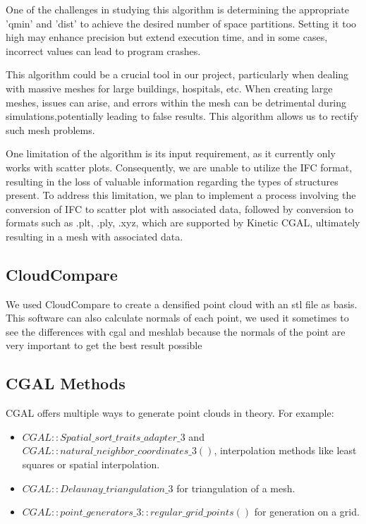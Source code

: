 \documentclass{article}
\begin{document}
  One of the challenges in studying this algorithm is determining the appropriate 'qmin' and 'dist' to achieve the desired number of space partitions.
  Setting it too high may enhance precision but extend execution time, and in some cases, incorrect values can lead to program crashes.

This algorithm could be a crucial tool in our project, particularly when dealing with massive meshes for large buildings,
hospitals, etc. When creating large meshes, issues can arise, and errors within the mesh can be detrimental during simulations,potentially leading to false results. 
This algorithm allows us to rectify such mesh problems.

One limitation of the algorithm is its input requirement, as it currently only works with scatter plots. Consequently, we are unable to utilize the IFC format, 
resulting in the loss of valuable information regarding the types of structures present. To address this limitation, 
we plan to implement a process involving the conversion of IFC to scatter plot with associated data, followed by conversion to formats such as .plt, .ply, .xyz,
which are supported by Kinetic CGAL, ultimately resulting in a mesh with associated data.


\subsection{CloudCompare}
We used CloudCompare to create a densified point cloud with an stl file as basis.
This software can also calculate normals of each point, we used it sometimes to 
see the differences with cgal and meshlab because the normals of the point are very important to get the best result possible 

\subsection{CGAL Methods}
CGAL offers multiple ways to generate point clouds in theory. For example:

\begin{itemize}
  \item $CGAL::Spatial\_sort\_traits\_adapter\_3$ and $CGAL::natural\_neighbor\_coordinates\_3()$, interpolation methods like least squares or spatial interpolation.
  \item $CGAL::Delaunay\_triangulation\_3$ for triangulation of a mesh.
  \item $CGAL::point\_generators\_3::regular\_grid\_points()$ for generation on a grid.
\end{itemize}
\end{document}
